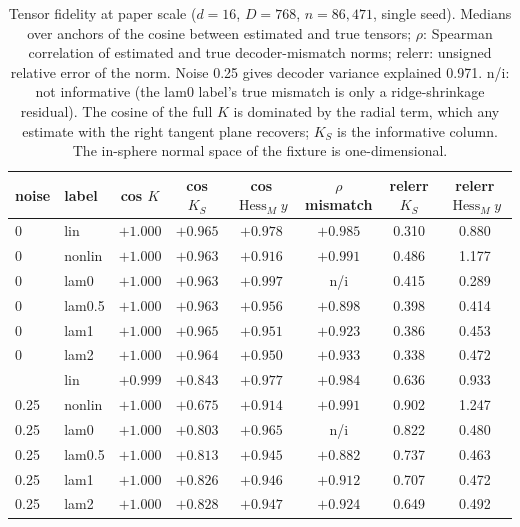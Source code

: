 \documentclass[10pt]{article}
\newcommand{\Hess}{\operatorname{Hess}_M}
\begin{document}
\begin{table}[h]
\centering\footnotesize\setlength{\tabcolsep}{4pt}
\begin{tabular}{llcccccc}
\toprule
noise & label & cos $K$ & cos $K_S$ & cos $\Hess y$ & $\rho$ mismatch & relerr $K_S$ & relerr $\Hess y$ \\
\midrule
0 & lin & $+1.000$ & $+0.965$ & $+0.978$ & $+0.985$ & 0.310 & 0.880 \\
0 & nonlin & $+1.000$ & $+0.963$ & $+0.916$ & $+0.991$ & 0.486 & 1.177 \\
0 & lam0 & $+1.000$ & $+0.963$ & $+0.997$ & n/i & 0.415 & 0.289 \\
0 & lam0.5 & $+1.000$ & $+0.963$ & $+0.956$ & $+0.898$ & 0.398 & 0.414 \\
0 & lam1 & $+1.000$ & $+0.965$ & $+0.951$ & $+0.923$ & 0.386 & 0.453 \\
0 & lam2 & $+1.000$ & $+0.964$ & $+0.950$ & $+0.933$ & 0.338 & 0.472 \\
\addlinespace[2pt]
0.25 & lin & $+0.999$ & $+0.843$ & $+0.977$ & $+0.984$ & 0.636 & 0.933 \\
0.25 & nonlin & $+1.000$ & $+0.675$ & $+0.914$ & $+0.991$ & 0.902 & 1.247 \\
0.25 & lam0 & $+1.000$ & $+0.803$ & $+0.965$ & n/i & 0.822 & 0.480 \\
0.25 & lam0.5 & $+1.000$ & $+0.813$ & $+0.945$ & $+0.882$ & 0.737 & 0.463 \\
0.25 & lam1 & $+1.000$ & $+0.826$ & $+0.946$ & $+0.912$ & 0.707 & 0.472 \\
0.25 & lam2 & $+1.000$ & $+0.828$ & $+0.947$ & $+0.924$ & 0.649 & 0.492 \\
\bottomrule
\end{tabular}
\caption{Tensor fidelity at paper scale ($d=16$, $D=768$, $n=86{,}471$, single seed). Medians over anchors of the cosine between estimated and true tensors; $\rho$: Spearman correlation of estimated and true decoder-mismatch norms; relerr: unsigned relative error of the norm. Noise 0.25 gives decoder variance explained 0.971. n/i: not informative (the lam0 label's true mismatch is only a ridge-shrinkage residual). The cosine of the full $K$ is dominated by the radial term, which any estimate with the right tangent plane recovers; $K_S$ is the informative column. The in-sphere normal space of the fixture is one-dimensional.}
\label{tab:tf}
\end{table}
\end{document}
